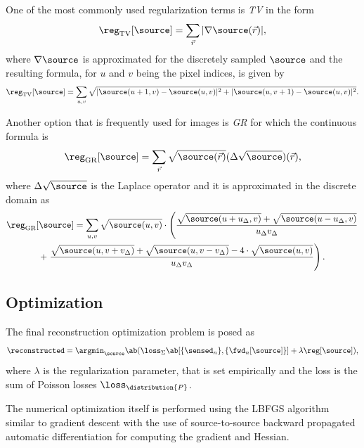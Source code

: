 One of the most commonly used regularization terms is \emph{\ac{TV}} in the form
\begin{equation*}
    \reg_{\text{TV}}[\source] = \sum_{\vec{r}}| \nabla \source(\vec{r})|,
\end{equation*}
where \(\nabla\source\) is approximated for the discretely sampled \(\source\) and the resulting formula, for \(u\) and
    \(v\) being the pixel indices, is given by
\begin{equation*}
    \reg_{\text{TV}}[\source] = \sum_{u,v} \sqrt{| \source(u + 1, v) - \source(u,v)|^2 + | \source(u, v + 1)
    - \source(u,v)|^2}.
\end{equation*}

Another option that is frequently used for images is \emph{\ac{GR}} for which the continuous formula is
\begin{equation*}
    \reg_{\text{GR}}[\source] = \sum_{\vec{r}} \sqrt{\source(\vec{r})}(\Delta \sqrt{\source})(\vec{r}),
\end{equation*}
where \(\Delta \sqrt{\source}\) is the Laplace operator and it is approximated in the discrete domain as
\begin{multline*}
        \reg_{\text{GR}}[\source] = \sum_{u,v} \sqrt{\source(u,v)} \cdot \left(\frac{\sqrt{\source(u + u_{\Delta}, v)}
        + \sqrt{\source(u - u_{\Delta}, v)}}{u_{\Delta} v_{\Delta}} \right. \\
        + \left.\frac{\sqrt{\source(u, v + v_{\Delta})} + \sqrt{\source(u, v - v_{\Delta})}
        - 4\cdot \sqrt{\source(u,v)}}{u_{\Delta} v_{\Delta}}\right).
\end{multline*}


\subsection{Optimization}

The final reconstruction optimization problem is posed as
\begin{equation*}
    \reconstructed =  \argmin_{\source} \ab(\loss_{\Sigma}\ab[\{\sensed_n\},\{\fwd_n[\source]\}]
    + \lambda\reg[\source]),
\end{equation*}
    where \(\lambda\) is the regularization parameter, that is set empirically and the loss is the sum of Poisson
    losses \(\loss_{\distribution{P}}\).

The numerical optimization itself is performed using the \ac{LBFGS} algorithm similar to 
    gradient descent with the use of source-to-source backward propagated automatic differentiation  
    for computing the gradient and Hessian.

